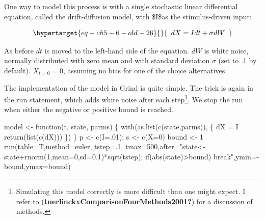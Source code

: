 \documentclass[
  letterpaper,
]{scrbook}
\newenvironment{Shaded}{\begin{snugshade}}{\end{snugshade}}
\newcommand{\AttributeTok}[1]{\textcolor[rgb]{0.40,0.45,0.13}{#1}}
\newcommand{\ControlFlowTok}[1]{\textcolor[rgb]{0.00,0.23,0.31}{#1}}
\newcommand{\DecValTok}[1]{\textcolor[rgb]{0.68,0.00,0.00}{#1}}
\newcommand{\FunctionTok}[1]{\textcolor[rgb]{0.28,0.35,0.67}{#1}}
\newcommand{\NormalTok}[1]{\textcolor[rgb]{0.00,0.23,0.31}{#1}}
\newcommand{\OtherTok}[1]{\textcolor[rgb]{0.00,0.23,0.31}{#1}}
\newcommand{\SpecialCharTok}[1]{\textcolor[rgb]{0.37,0.37,0.37}{#1}}
\newcommand{\StringTok}[1]{\textcolor[rgb]{0.13,0.47,0.30}{#1}}
\begin{document}
One way to model this process is with a single stochastic linear
differential equation, called the drift-diffusion model, with \$I\$as
the stimulus-driven input:

\begin{equation}\protect\hypertarget{eq-ch5-6-old-26}{}{\begin{array}{r}
dX = Idt + \sigma dW
\end{array}}\label{eq-ch5-6-old-26}\end{equation}

As before \(dt\) is moved to the left-hand side of the equation. \(dW\)
is white noise, normally distributed with zero mean and with standard
deviation \(\sigma\) (set to .1 by default). \(X_{t = 0} = 0\), assuming
no bias for one of the choice alternatives.

The implementation of the model in Grind is quite simple. The trick is
again in the run statement, which adds white noise after each
step\footnote{Simulating this model correctly is more difficult than one
  might expect. I refer to
  (\textbf{tuerlinckxComparisonFourMethods2001?}) for a discussion of
  methods.}. We stop the run when either the negative or positive bound
is reached.

\begin{Shaded}
\begin{Highlighting}[]
\NormalTok{model }\OtherTok{\textless{}{-}} \ControlFlowTok{function}\NormalTok{(t, state, parms) \{}
  \FunctionTok{with}\NormalTok{(}\FunctionTok{as.list}\NormalTok{(}\FunctionTok{c}\NormalTok{(state,parms)), \{}
\NormalTok{    dX }\OtherTok{=}\NormalTok{ I}
    \FunctionTok{return}\NormalTok{(}\FunctionTok{list}\NormalTok{(}\FunctionTok{c}\NormalTok{(dX)))}
\NormalTok{  \})}
\NormalTok{\}}
\NormalTok{p }\OtherTok{\textless{}{-}} \FunctionTok{c}\NormalTok{(}\AttributeTok{I=}\NormalTok{.}\DecValTok{01}\NormalTok{); s }\OtherTok{\textless{}{-}} \FunctionTok{c}\NormalTok{(}\AttributeTok{X=}\DecValTok{0}\NormalTok{)}
\NormalTok{bound }\OtherTok{\textless{}{-}} \DecValTok{1}
\FunctionTok{run}\NormalTok{(}\AttributeTok{table=}\NormalTok{T,}\AttributeTok{method=}\StringTok{\textquotesingle{}euler\textquotesingle{}}\NormalTok{, }\AttributeTok{tstep=}\NormalTok{.}\DecValTok{1}\NormalTok{,}
    \AttributeTok{tmax=}\DecValTok{500}\NormalTok{,}\AttributeTok{after=}\StringTok{"state\textless{}{-}state+rnorm(1,mean=0,sd=0.1)*sqrt(tstep);}
\StringTok{    if(abs(state)\textgreater{}bound) break"}\NormalTok{,}\AttributeTok{ymin=}\SpecialCharTok{{-}}\NormalTok{bound,}\AttributeTok{ymax=}\NormalTok{bound)}
\end{Highlighting}
\end{Shaded}
\end{document}
